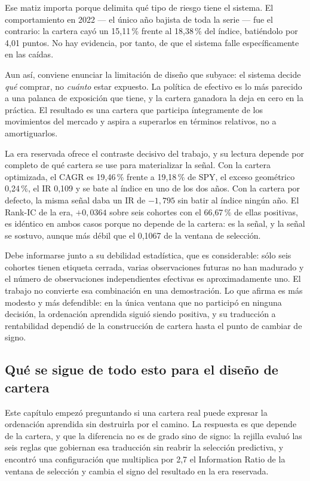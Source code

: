 Ese matiz importa porque delimita qué tipo de riesgo tiene el sistema. El comportamiento en 2022
--- el único año bajista de toda la serie --- fue el contrario: la cartera cayó un 15,11\,\% frente
al 18,38\,\% del índice, batiéndolo por 4,01 puntos. No hay evidencia, por tanto, de que el sistema
falle específicamente en las caídas.

Aun así, conviene enunciar la limitación de diseño que subyace: el sistema decide \emph{qué}
comprar, no \emph{cuánto} estar expuesto. La política de efectivo es lo más parecido a una palanca
de exposición que tiene, y la cartera ganadora la deja en cero en la práctica. El resultado es una
cartera que participa íntegramente de los movimientos del mercado y aspira a superarlos en términos
relativos, no a amortiguarlos.

La era reservada ofrece el contraste decisivo del trabajo, y su lectura depende por completo de qué
cartera se use para materializar la señal. Con la cartera optimizada, el CAGR es 19,46\,\% frente a
19,18\,\% de SPY, el exceso geométrico 0,24\,\%, el IR 0,109 y se bate al índice en uno de los dos
años. Con la cartera por defecto, la misma señal daba un IR de $-1{,}795$ sin batir al índice ningún
año. El Rank-IC de la era, $+0{,}0364$ sobre seis cohortes con el 66,67\,\% de ellas positivas, es
idéntico en ambos casos porque no depende de la cartera: es la señal, y la señal se sostuvo, aunque
más débil que el 0,1067 de la ventana de selección.

Debe informarse junto a su debilidad estadística, que es considerable: sólo seis cohortes tienen
etiqueta cerrada, varias observaciones futuras no han madurado y el número de observaciones
independientes efectivas es aproximadamente uno. El trabajo no convierte esa combinación en una
demostración. Lo que afirma es más modesto y más defendible: en la única ventana que no participó en
ninguna decisión, la ordenación aprendida siguió siendo positiva, y su traducción a rentabilidad
dependió de la construcción de cartera hasta el punto de cambiar de signo.

\subsection*{Qué se sigue de todo esto para el diseño de cartera}

Este capítulo empezó preguntando si una cartera real puede expresar la ordenación aprendida sin
destruirla por el camino. La respuesta es que depende de la cartera, y que la diferencia no es de
grado sino de signo: la rejilla evaluó las seis reglas que gobiernan esa traducción sin reabrir la
selección predictiva, y encontró una configuración que multiplica por 2,7 el Information Ratio de la
ventana de selección y cambia el signo del resultado en la era reservada.


